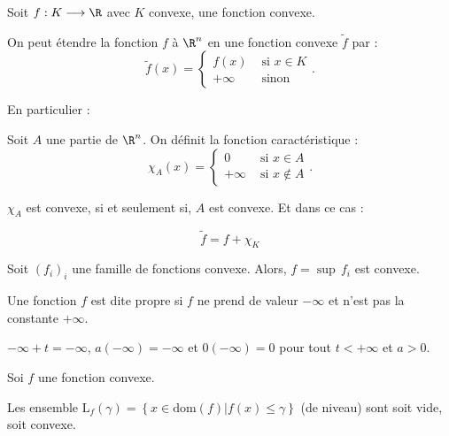 \documentclass[12pt,a4paper]{article}
\begin{document}
	\begin{prop}
		\begin{minipage}[t]{15cm}
			Soit $f : K \longrightarrow \R$ avec $K$ convexe, une fonction convexe.
		\end{minipage}
		
		On peut étendre la fonction $f$ à $\R^n$ en une fonction convexe $\tilde{f}$ par  :
		\[
			\tilde f(x) = \begin{cases}
				f(x) & \text{ si } x \in K \\
				+\infty & \text{ sinon}
			\end{cases}.
		\]
	\end{prop}
	
	En particulier : \begin{minipage}[t]{15cm}
		Soit $A$ une partie de $\R^n$. On définit la fonction caractéristique :
		\[
			\chi_A(x) = \begin{cases}
				0 & \text{ si } x \in A \\
				+\infty & \text{ si } x \not\in A
			\end{cases}.
		\]
	\end{minipage}
	
	\begin{rmq}
		\begin{minipage}[t]{18cm}
			$\chi_A$ est convexe, si et seulement si, $A$ est convexe. Et dans ce cas :
		\end{minipage}
		\begin{equation}
			\tilde f = f + \chi_K
		\end{equation}
	\end{rmq}
	
	\begin{prop}
		Soit $(f_i)_i$ une famille de fonctions convexe. Alors, $f = \sup \, f_i$ est convexe.
	\end{prop}
	
	\begin{defi}
		Une fonction $f$ est dite propre si $f$ ne prend de valeur $-\infty$ et n'est pas la constante $+\infty$.
	\end{defi}
	
	\begin{rmq}
		\begin{minipage}[t]{15cm}
			$-\infty + t = -  \infty$, $a(-\infty) = -\infty$ et $0(-\infty) = 0$ pour tout $t < +\infty$ et $a > 0$.
		\end{minipage}
	\end{rmq}
	
	\begin{prop}
		Soi $f$ une fonction convexe.
		
		\begin{minipage}{17cm}
			Les ensemble $\mathrm{L}_f(\gamma) = \left\{x \in \mathrm{dom}(f)\Big| f(x) \leq \gamma\right\}$ (de niveau) sont soit vide, soit convexe.
		\end{minipage}
	\end{prop}
	
\end{document}
